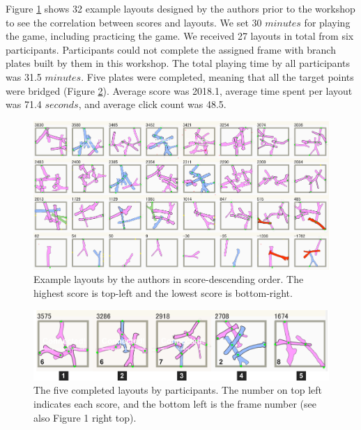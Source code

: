 Figure \ref{fig:testlayouts} shows 32 example layouts designed by the authors prior to the workshop to see the correlation between scores and layouts.
We set 30 $minutes$ for playing the game, including practicing the game.
We received 27 layouts in total from six participants.
Participants could not complete the assigned frame with branch plates built by them in this workshop.
The total playing time by all participants was 31.5 $minutes$.
Five plates were completed, meaning that all the target points were bridged (Figure \ref{fig:layouts}).
Average score was 2018.1, average time spent per layout was 71.4 $seconds$, and average click count was 48.5.

\begin{figure}[ht]
	\begin{center}
		\includegraphics[width = 0.4\paperwidth]{images/fabrication/designs_score.png}
		\caption{Example layouts by the authors in score-descending order. The highest score is top-left and the lowest score is bottom-right.}
		\label{fig:testlayouts}
	\end{center}
\end{figure}

\begin{figure}[ht]
	\begin{center}
		\includegraphics[width = 0.4\paperwidth]{images/fabrication/casestudy.pdf}
		\caption{The five completed layouts by participants. The number on top left indicates each score, and the bottom left is the frame number (see also Figure 1 right top).   }
		\label{fig:layouts}
	\end{center}
\end{figure}

